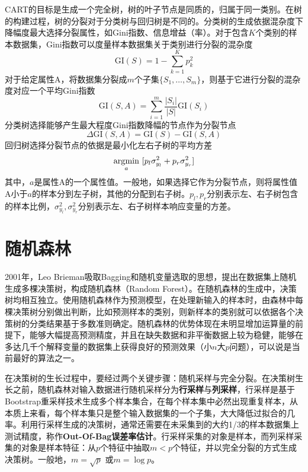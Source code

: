 CART的目标是生成一个完全树，树的叶子节点是同质的，归属于同一类别。在树的构建过程，树的分裂对于分类树与回归树是不同的。分类树的生成依据混杂度下降幅度最大选择分裂属性，如Gini指数、信息增益（率）。对于包含$K$个类别的样本数据集，Gini指数可以度量样本数据集关于类别进行分裂的混杂度
\begin{equation}
    \text{GI}(S) = 1- \sum\limits_{k=1}^K p_k^2
\end{equation}
对于给定属性A，将数据集分裂成$m$个子集$\{S_1,\ldots,S_m\}$，则基于它进行分裂的混杂度对应一个平均Gini指数
\begin{equation}
    \text{GI}(S,A) = \sum\limits_{i=1}^m \frac{|S_i|}{|S|} \text{GI}(S_i)
\end{equation}
分类树选择能够产生最大程度Gini指数降幅的节点作为分裂节点
\begin{equation}
    \Delta \text{GI}(S,A) = \text{GI}(S) - \text{GI}(S,A)
\end{equation}
回归树选择分裂节点的依据是最小化左右子树的平均方差
\begin{equation}
    \operatorname*{\mathrm{\arg\!\min}}\limits_{a}~[p_l \sigma^2_{y_l} + p_r \sigma^2_{y_r}]
\end{equation}
其中，$a$是属性A的一个属性值。一般地，如果选择它作为分裂节点，则将属性值A小于$a$的样本分到左子树，其他的分配到右子树。$p_l,p_r$分别表示左、右子树包含的样本比例，$\sigma^2_{y_l},\sigma^2_{y_r}$分别表示左、右子树样本响应变量的方差。

\section{随机森林}
2001年，Leo Brieman\cite{breiman2001random}吸取Bagging和随机变量选取的思想，提出在数据集上随机生成多棵决策树，构成随机森林（Random Forest）。在随机森林的生成中，决策树均相互独立。使用随机森林作为预测模型，在处理新输入的样本时，由森林中每棵决策树分别做出判断，比如预测样本的类别，则新样本的类别就可以依据各个决策树的分类结果基于多数准则确定。随机森林的优势体现在未明显增加运算量的前提下，能够大幅提高预测精度，并且在缺失数据和非平衡数据上较为稳健，能够在多达几千个解释变量的数据集上获得良好的预测效果（小$n$大$p$问题），可以说是当前最好的算法之一。

在决策树的生长过程中，要经过两个关键步骤：随机采样与完全分裂。在决策树生长之前，随机森林对输入数据进行随机采样分为\textbf{行采样}与\textbf{列采样}，行采样是基于Bootstrap重采样技术生成多个样本集合，在每个样本集中必然出现重复样本，从本质上来看，每个样本集只是整个输入数据集的一个子集，大大降低过拟合的几率。利用行采样生成的决策树，通常还需要在未采集到的大约1/3的样本数据集上测试精度，称作\textbf{Out-Of-Bag误差率估计}。行采样采集的对象是样本，而列采样采集的对象是样本特征：从$p$个特征中抽取$m<p$个特征，并以完全分裂的方式生成决策树。一般地，$m=\sqrt{p}$ 或$m=\log{p}$。

